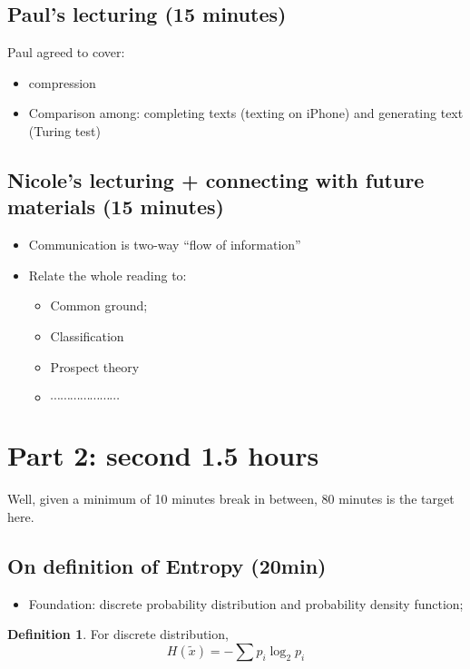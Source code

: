 \documentclass[12pt]{article}
\theoremstyle{definition}
\newtheorem{definition}[theorem]{Definition}
\theoremstyle{plain}
\begin{document}
\subsection{Paul's lecturing (15 minutes)}
Paul agreed to cover:
\begin{itemize}
    \item compression
    \item Comparison among: completing texts (texting on iPhone) and generating
        text (Turing test)
\end{itemize}



\subsection{Nicole's lecturing + connecting with future materials (15 minutes)}
\begin{itemize}
    \item Communication is two-way ``flow of information''
    \item Relate the whole reading to:
        \begin{itemize}
            \item Common ground;
            \item Classification
            \item Prospect theory
            \item $\cdots$$\cdots$$\cdots$$\cdots$$\cdots$$\cdots$$\cdots$
        \end{itemize}
\end{itemize}



\section{Part 2: second 1.5 hours}
Well, given a minimum of 10 minutes break in between, 80 minutes is the target
here.

\subsection{On definition of Entropy (20min) }
        \begin{itemize}
            \item Foundation: discrete probability distribution and probability density function;
        \end{itemize}
\begin{definition}
    For discrete distribution,
    \[
        H(\tilde x) = - \sum p_i \log_{2} p_i
    \]
\end{definition}
\end{document}

